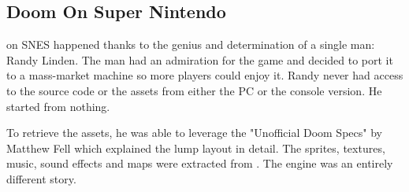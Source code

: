 \pagebreak


\par
{}
















\subsection{Doom On Super Nintendo}

\doom{} on SNES happened thanks to the genius and determination of a single man: Randy Linden. The man had an admiration for the game and decided to port it to a mass-market machine so more players could enjoy it. Randy never had access to the source code or the assets from either the PC or the console version. He started from nothing.\\
\par
To retrieve the assets, he was able to leverage the "Unofficial Doom Specs" by Matthew Fell which explained the  lump layout in detail. The sprites, textures, music, sound effects and maps were extracted from . The engine was an entirely different story.\\
\par

